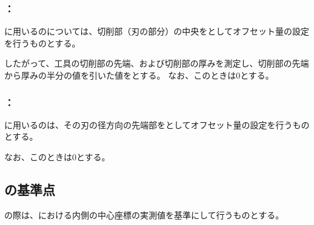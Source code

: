 \subsubsection{\indexTLCDimpleMilling\nameTLCorrection：\nameDimpleMilling}
\DimpleMilling に用いる\indexTLTSlotCutter\nameTSlotCutter の\nameToolLength については、切削部（刃の部分）の中央を\ToolLength としてオフセット量の設定を行うものとする。

したがって、工具の切削部の先端、および切削部の厚みを測定し、切削部の先端から厚みの半分の値を引いた値を\nameTLCorrection とする。
なお、このとき\TLCWearValue は0とする。

\subsubsection{\indexTDCDimpleMilling\nameTDCorrection：\nameDimpleMilling}
\DimpleMilling に用いる\indexTDTSlotCutter\nameTSlotCutter の\nameToolDiameter は、その刃の径方向の先端部を\ToolDiameter としてオフセット量の設定を行うものとする。

なお、このとき\TDCWearValue は0とする。


\subsection{\DimpleMilling の基準点}
\DimpleMilling の際は、\TopEndFace における内側の中心座標の実測値を基準にして行うものとする。


